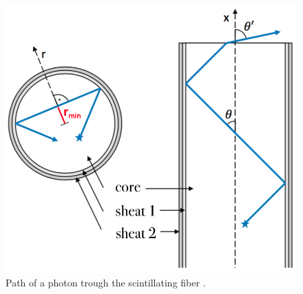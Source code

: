 \begin{figure}[H]
	\centering
	\includegraphics[width=0.5\linewidth]{pics/photon_path.png}
	\caption{Path of a photon trough the scintillating fiber \cite{SciFi}.}
	\label{fig:photon_path}
\end{figure}

